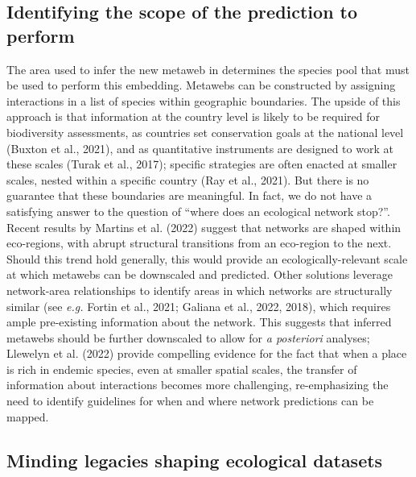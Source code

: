 \documentclass[11pt]{article}
\begin{document}
\hypertarget{identifying-the-scope-of-the-prediction-to-perform}{%
\subsection{Identifying the scope of the prediction to
perform}\label{identifying-the-scope-of-the-prediction-to-perform}}

The area used to infer the new metaweb in determines the species pool
that must be used to perform this embedding. Metawebs can be constructed
by assigning interactions in a list of species within geographic
boundaries. The upside of this approach is that information at the
country level is likely to be required for biodiversity assessments, as
countries set conservation goals at the national level (Buxton et al.,
2021), and as quantitative instruments are designed to work at these
scales (Turak et al., 2017); specific strategies are often enacted at
smaller scales, nested within a specific country (Ray et al., 2021). But
there is no guarantee that these boundaries are meaningful. In fact, we
do not have a satisfying answer to the question of ``where does an
ecological network stop?''. Recent results by Martins et al. (2022)
suggest that networks are shaped within eco-regions, with abrupt
structural transitions from an eco-region to the next. Should this trend
hold generally, this would provide an ecologically-relevant scale at
which metawebs can be downscaled and predicted. Other solutions leverage
network-area relationships to identify areas in which networks are
structurally similar (see \emph{e.g.} Fortin et al., 2021; Galiana et
al., 2022, 2018), which requires ample pre-existing information about
the network. This suggests that inferred metawebs should be further
downscaled to allow for \emph{a posteriori} analyses; Llewelyn et al.
(2022) provide compelling evidence for the fact that when a place is
rich in endemic species, even at smaller spatial scales, the transfer of
information about interactions becomes more challenging, re-emphasizing
the need to identify guidelines for when and where network predictions
can be mapped.

\hypertarget{minding-legacies-shaping-ecological-datasets}{%
\subsection{Minding legacies shaping ecological
datasets}\label{minding-legacies-shaping-ecological-datasets}}
\end{document}
